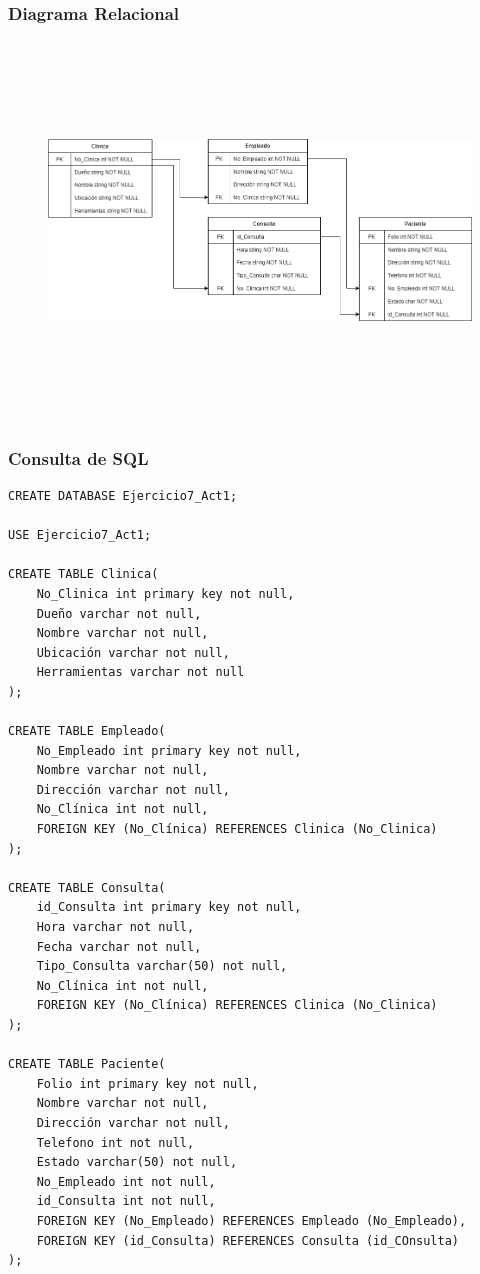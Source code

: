 \documentclass[a4paper, 12pt]{article}
\begin{document}
\begin{justify}
        \subsubsection{Diagrama Relacional}
        \begin{figure}[H]
            \centering
            \includegraphics[width=16cm,height=10cm]{rel7.png}
        \end{figure}
        \subsubsection{Consulta de SQL}
\begin{verbatim}
CREATE DATABASE Ejercicio7_Act1;

USE Ejercicio7_Act1;

CREATE TABLE Clinica(
    No_Clinica int primary key not null,
    Dueño varchar not null,
    Nombre varchar not null,
    Ubicación varchar not null,
    Herramientas varchar not null
);

CREATE TABLE Empleado(
    No_Empleado int primary key not null,
    Nombre varchar not null,
    Dirección varchar not null,
    No_Clínica int not null,
    FOREIGN KEY (No_Clínica) REFERENCES Clinica (No_Clinica)
);

CREATE TABLE Consulta(
    id_Consulta int primary key not null,
    Hora varchar not null,
    Fecha varchar not null,
    Tipo_Consulta varchar(50) not null,
    No_Clínica int not null,
    FOREIGN KEY (No_Clínica) REFERENCES Clinica (No_Clinica)
);

CREATE TABLE Paciente(
    Folio int primary key not null,
    Nombre varchar not null,
    Dirección varchar not null,
    Telefono int not null,
    Estado varchar(50) not null,
    No_Empleado int not null,
    id_Consulta int not null,
    FOREIGN KEY (No_Empleado) REFERENCES Empleado (No_Empleado),
    FOREIGN KEY (id_Consulta) REFERENCES Consulta (id_COnsulta)
);
\end{verbatim}

\end{justify}
\end{document}
